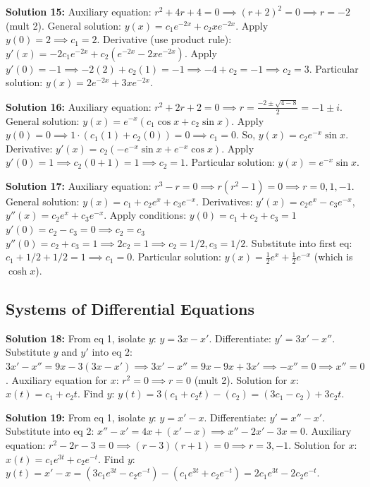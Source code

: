 \documentclass[12pt]{article}
\begin{document}
\textbf{Solution 15:} 
Auxiliary equation: $r^2 + 4r + 4 = 0 \implies (r+2)^2 = 0 \implies r = -2$ (mult 2). 
General solution: $y(x) = c_1e^{-2x} + c_2xe^{-2x}$. 
Apply $y(0) = 2 \implies c_1 = 2$. 
Derivative (use product rule): $y'(x) = -2c_1e^{-2x} + c_2(e^{-2x} - 2xe^{-2x})$. 
Apply $y'(0) = -1 \implies -2(2) + c_2(1) = -1 \implies -4 + c_2 = -1 \implies c_2 = 3$. 
Particular solution: $y(x) = 2e^{-2x} + 3xe^{-2x}$.

\textbf{Solution 16:} 
Auxiliary equation: $r^2 + 2r + 2 = 0 \implies r = \frac{-2 \pm \sqrt{4-8}}{2} = -1 \pm i$. 
General solution: $y(x) = e^{-x}(c_1\cos x + c_2\sin x)$. 
Apply $y(0) = 0 \implies 1 \cdot (c_1(1) + c_2(0)) = 0 \implies c_1 = 0$. 
So, $y(x) = c_2e^{-x}\sin x$. 
Derivative: $y'(x) = c_2(-e^{-x}\sin x + e^{-x}\cos x)$. 
Apply $y'(0) = 1 \implies c_2(0 + 1) = 1 \implies c_2 = 1$. 
Particular solution: $y(x) = e^{-x}\sin x$.

\textbf{Solution 17:} 
Auxiliary equation: $r^3 - r = 0 \implies r(r^2-1) = 0 \implies r = 0, 1, -1$. 
General solution: $y(x) = c_1 + c_2e^x + c_3e^{-x}$. 
Derivatives: $y'(x) = c_2e^x - c_3e^{-x}$, $y''(x) = c_2e^x + c_3e^{-x}$. 
Apply conditions: 
$y(0) = c_1 + c_2 + c_3 = 1$ 
$y'(0) = c_2 - c_3 = 0 \implies c_2 = c_3$ 
$y''(0) = c_2 + c_3 = 1 \implies 2c_2 = 1 \implies c_2 = 1/2, c_3 = 1/2$. 
Substitute into first eq: $c_1 + 1/2 + 1/2 = 1 \implies c_1 = 0$. 
Particular solution: $y(x) = \frac{1}{2}e^x + \frac{1}{2}e^{-x}$ (which is $\cosh x$).

\subsection*{Systems of Differential Equations}
\textbf{Solution 18:} 
From eq 1, isolate $y$: $y = 3x - x'$. 
Differentiate: $y' = 3x' - x''$. 
Substitute $y$ and $y'$ into eq 2: 
$3x' - x'' = 9x - 3(3x - x') \implies 3x' - x'' = 9x - 9x + 3x' \implies -x'' = 0 \implies x'' = 0$. 
Auxiliary equation for $x$: $r^2 = 0 \implies r = 0$ (mult 2). 
Solution for $x$: $x(t) = c_1 + c_2t$. 
Find $y$: $y(t) = 3(c_1 + c_2t) - (c_2) = (3c_1 - c_2) + 3c_2t$.

\textbf{Solution 19:} 
From eq 1, isolate $y$: $y = x' - x$. 
Differentiate: $y' = x'' - x'$. 
Substitute into eq 2: 
$x'' - x' = 4x + (x' - x) \implies x'' - 2x' - 3x = 0$. 
Auxiliary equation: $r^2 - 2r - 3 = 0 \implies (r-3)(r+1) = 0 \implies r = 3, -1$. 
Solution for $x$: $x(t) = c_1e^{3t} + c_2e^{-t}$. 
Find $y$: $y(t) = x' - x = (3c_1e^{3t} - c_2e^{-t}) - (c_1e^{3t} + c_2e^{-t}) = 2c_1e^{3t} - 2c_2e^{-t}$.
\end{document}
